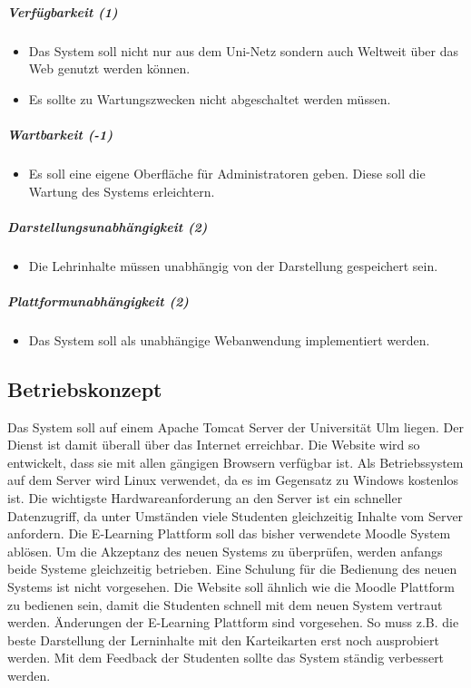 \documentclass[12pt,a4paper]{article}
\begin{document}
{\begin{itemize}
\end{itemize}
\subparagraph{Verfügbarkeit (1)}
\begin{itemize}
	\item Das System soll nicht nur aus dem Uni-Netz sondern auch Weltweit über das Web genutzt werden können.
	\item Es sollte zu Wartungszwecken nicht abgeschaltet werden müssen.
\end{itemize}
\subparagraph{Wartbarkeit (-1)}
\begin{itemize}
	\item Es soll eine eigene Oberfläche für Administratoren geben. Diese soll  die Wartung des Systems erleichtern.
\end{itemize}
\subparagraph{Darstellungsunabhängigkeit (2)}
\begin{itemize}
	\item Die Lehrinhalte müssen unabhängig von der Darstellung gespeichert sein.
\end{itemize}
\subparagraph{Plattformunabhängigkeit (2)}
\begin{itemize}
	\item Das System soll als unabhängige Webanwendung implementiert werden.
\end{itemize}

\subsection{Betriebskonzept}
Das System soll auf einem Apache Tomcat Server der Universität Ulm liegen. Der Dienst ist damit überall über das Internet erreichbar. Die Website wird so entwickelt, dass sie mit allen gängigen Browsern verfügbar ist. Als Betriebssystem auf dem Server wird Linux verwendet, da es im Gegensatz zu Windows kostenlos ist. Die wichtigste Hardwareanforderung an den Server ist ein schneller Datenzugriff, da unter Umständen viele Studenten gleichzeitig Inhalte vom Server anfordern. Die E-Learning Plattform soll das bisher verwendete Moodle System ablösen. Um die Akzeptanz des neuen Systems zu überprüfen, werden anfangs beide Systeme gleichzeitig betrieben. Eine Schulung für die Bedienung des neuen Systems ist nicht vorgesehen. Die Website soll ähnlich wie die Moodle Plattform zu bedienen sein, damit die Studenten schnell mit dem neuen System vertraut werden. Änderungen der E-Learning Plattform sind vorgesehen. So muss z.B. die beste Darstellung der Lerninhalte mit den Karteikarten erst noch ausprobiert werden. Mit dem Feedback der Studenten sollte das System ständig verbessert werden.


}
\end{document}
